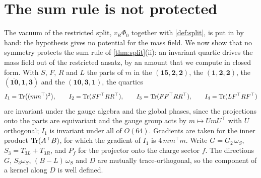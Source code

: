 \section{The sum rule is not protected}
\label{sec:potential}

The vacuum of the restricted split, $v_R\Phi_0$ together with \cref{def:split}, is put in by hand: the hypothesis gives no potential for the
mass field. We now show that no symmetry protects the sum rule of \cref{thm:split}(ii): an invariant quartic drives the mass field out of the
restricted ansatz, by an amount that we compute in closed form. With $S$, $F$, $R$ and $L$ the parts of $m$ in the
$(\mathbf{15},\mathbf2,\mathbf2)$, the $(\mathbf1,\mathbf2,\mathbf2)$, the $(\overline{\mathbf{10}},\mathbf1,\mathbf3)$ and the
$(\mathbf{10},\mathbf3,\mathbf1)$, the quartics
\[
I_1=\operatorname{Tr}\bigl((mm^\top)^2\bigr),\qquad I_2=\operatorname{Tr}(SF^\top RR^\top),\qquad I_3=\operatorname{Tr}(FF^\top RR^\top),\qquad I_4=\operatorname{Tr}(LF^\top RF^\top)
\]
are invariant under the gauge algebra and the global phases, since the projections onto the parts are equivariant and the gauge group acts by
$m\mapsto UmU^\top$ with $U$ orthogonal; $I_1$ is invariant under all of $O(64)$. Gradients are taken for the inner product $\operatorname{Tr}(A^\top B)$,
for which the gradient of $I_1$ is $4\,mm^\top m$. Write $G=G_2\,\omega_S$, $S_3=T_{3L}+T_{3R}$, and $P_f$ for the projector onto the charge
sector $f$. The directions $G$, $S_3\omega_S$, $(B\!-\!L)\,\omega_S$ and $D$ are mutually trace-orthogonal, so the component of a kernel along
$D$ is well defined.

